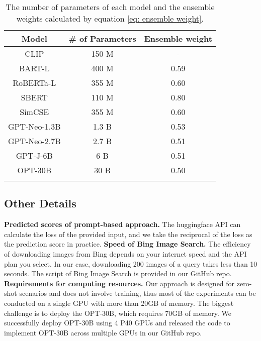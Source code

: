 \documentclass[11pt]{article}
\begin{document}
\begin{table}[!htbp]
\centering
\small
\begin{tabular}{ccc}
\Xhline{3\arrayrulewidth}      
\textbf{Model}        & \textbf{\# of Parameters} & \textbf{Ensemble weight} \\ \hline
CLIP         & 150 M            & -               \\
BART-L       & 400 M            & 0.59            \\
RoBERTa-L    & 355 M            & 0.60            \\
SBERT        & 110 M            & 0.80            \\
SimCSE       & 355 M            & 0.60            \\
GPT-Neo-1.3B & 1.3 B            & 0.53            \\
GPT-Neo-2.7B & 2.7 B            & 0.51            \\
GPT-J-6B     & 6 B              & 0.51            \\
OPT-30B      & 30 B             & 0.50            
\\\Xhline{3\arrayrulewidth}      
\end{tabular}
\caption{The number of parameters of each model and the ensemble weights calculated by equation \ref{eq: ensemble weight}.}
\label{tab n parameters}
\end{table} 
\subsection{Other Details}
\textbf{Predicted scores of prompt-based approach.} The huggingface API can calculate the loss of the provided input, and we take the reciprocal of the loss as the prediction score in practice.
\medbreak
\noindent \textbf{Speed of Bing Image Search.} The efficiency of downloading images from Bing depends on your internet speed and the API plan you select. In our case, downloading 200 images of a query takes less than 10 seconds. The script of Bing Image Search is provided in our GitHub repo.
\medbreak
\noindent \textbf{Requirements for computing resources.} Our approach is designed for zero-shot scenarios and does not involve training, thus most of the experiments can be conducted on a single GPU with more than 20GB of memory. The biggest challenge is to deploy the OPT-30B, which requires 70GB of memory. We successfully deploy OPT-30B using 4 P40 GPUs and released the code to implement OPT-30B across multiple GPUs in our GitHub repo.
\end{document}
